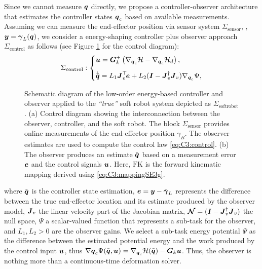 Since we cannot measure ${\boldsymbol{q}}$ directly, we propose a controller-observer architecture that estimates the controller states ${\boldsymbol{q}}_c$ based on available measurements. Assuming we can measure the end-effector position via sensor system $\Sigma_{\textrm{sensor}}$, \ie, ${\boldsymbol{y}} = {\boldsymbol{\gamma}}_L({\boldsymbol{q}})$, we consider a energy-shaping controller plus observer approach $\Sigma_{\textrm{control}}$ as follows (see Figure \ref{fig:C3:diagram_control} for the control diagram):
\begin{align}
  \Sigma_{\textrm{control}}:
  \begin{dcases}
    \vspace{2mm}
    \uB  = \GB_k^+ \left( \nabla_{\vec{q}_c}{\Hm} - \nabla_{\vec{q}_c}{\Hm}_d \right), \\ 
    \dot{\tilde{\qB}} = L_1 \JB_v^\top\!\eB + L_2 (\IB - \JB_v^\dag\JB_v) \nabla_{\q_c} \Psi,
  \end{dcases}
\end{align}
%
%
\begin{figure}[!t]
  \centering
  
  \vspace{-2mm}
  \caption{\small Schematic diagram of the low-order energy-based controller and observer applied to the \textit{``true''} soft robot system depicted as $\Sigma_{\textrm{softrobot}}$. (a) Control diagram showing the interconnection between the observer, controller, and the soft robot. The block $\Sigma_{\textrm{sensor}}$ provides online measurements of the end-effector position $\gamma_B$. The observer estimates are used to compute the control law \eqref{eq:C3:control}. (b) The observer produces an estimate $\tilde{{\boldsymbol{q}}}$ based on a measurement error ${\boldsymbol{e}}$ and the control signals ${\boldsymbol{u}}$. Here, $\textrm{FK}$ is the forward kinematic mapping derived using \eqref{eq:C3:mappingSE3g}.}
  \label{fig:C3:diagram_control}
  \vspace{-3mm}
\end{figure}
%
where $\tilde{{\boldsymbol{q}}}$ is the controller state estimation, ${\boldsymbol{e}} = {\boldsymbol{y}} - \tilde{{\boldsymbol{\gamma}}}_L$ represents the difference between the true end-effector location and its estimate produced by the observer model, ${\boldsymbol{J}}_v$ the linear velocity part of the Jacobian matrix, $\boldsymbol{\mathcal{N}} = ({\boldsymbol{I}} - {\boldsymbol{J}}_v^\dag{\boldsymbol{J}}_v)$ the null space, $\Psi$ a scalar-valued function that represents a sub-task for the observer, and $L_1,L_2 > 0$ are the observer gains. We select a sub-task energy potential $\Psi$ as the difference between the estimated potential energy and the work produced by the control input ${\boldsymbol{u}}$, thus $\nabla{{\boldsymbol{q}}_c} \Psi(\tilde{{\boldsymbol{q}}},{\boldsymbol{u}}) = \nabla_{{\boldsymbol{q}}_c}\mathcal{H}(\tilde{{\boldsymbol{q}}}) - {\boldsymbol{G}}_k {\boldsymbol{u}}$. Thus, the observer is nothing more than a continuous-time deformation solver.%
